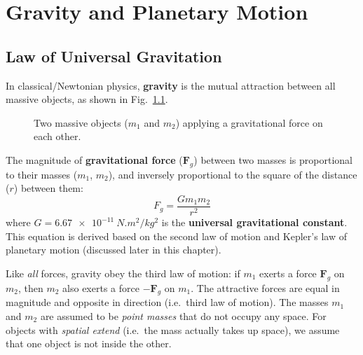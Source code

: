 \chapter{Gravity and Planetary Motion}
\label{chapter:gravity}

\section{Law of Universal Gravitation}
In classical/Newtonian physics, \textbf{gravity} is the mutual attraction
between all massive objects, as shown in Fig.~\ref{fig:gravity1}.
\begin{figure}[ht]
  \centering
  \caption{Two massive objects ($m_1$ and $m_2$) applying a gravitational force
    on each other.}
  \label{fig:gravity1}
\end{figure}

The magnitude of \textbf{gravitational force} ($\bm F_g$)  between two
masses is proportional to their masses ($m_1$, $m_2$), and inversely
proportional to the square of the distance ($r$) between them:
\begin{equation}
  \boxed{
    F_g=\frac{Gm_1m_2}{r^2}
  }
  \label{eq:law-of-gravity}
\end{equation}
where $G=\SI{6.67e-11}{N.m^2/kg^2}$ is the \textbf{universal gravitational
  constant}. This equation is derived based on the second law of motion and
Kepler's law of planetary motion (discussed later in this chapter). 

Like \emph{all} forces, gravity obey the third law of motion: if $m_1$ exerts a
force $\bm F_g$ on $m_2$, then $m_2$ also exerts a force $-\bm F_g$ on
$m_1$. The attractive forces are equal in magnitude and opposite in direction
(i.e.\ third law of motion). The masses $m_1$ and $m_2$ are assumed to be
\emph{point masses} that do not occupy any space. For objects with
\emph{spatial extend} (i.e.\ the mass actually takes up space), we assume that
one object is not inside the other.

